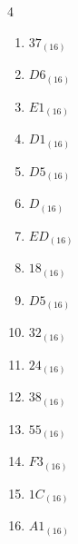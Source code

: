 \begin{multicols}{4}
\begin{enumerate}
  \item $37_{(16)}$

        \phantom{$=55$}

\columnbreak %

  \item $D6_{(16)}$

        \phantom{$=214$}

  \item $E1_{(16)}$

        \phantom{$=225$}

  \item $D1_{(16)}$

        \phantom{$=209$}

  \item $D5_{(16)}$

        \phantom{$=213$}

  \item $D_{(16)}$

        \phantom{$=13$}

  \item $ED_{(16)}$

        \phantom{$=237$}

  \item $18_{(16)}$

        \phantom{$=24$}

  \item $D5_{(16)}$

        \phantom{$=213$}

  \item $32_{(16)}$

        \phantom{$=50$}

  \item $24_{(16)}$

        \phantom{$=36$}

  \item $38_{(16)}$

        \phantom{$=56$}

  \item $55_{(16)}$

        \phantom{$=85$}

  \item $F3_{(16)}$

        \phantom{$=243$}

  \item $1C_{(16)}$

        \phantom{$=28$}

  \item $A1_{(16)}$


\end{enumerate}
\end{multicols}
